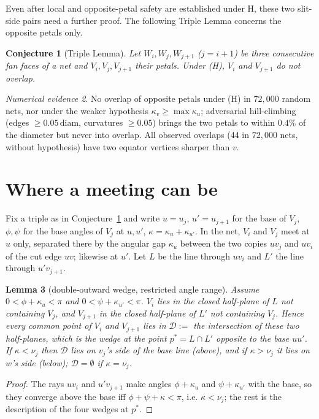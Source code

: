 \documentclass[11pt]{article}
\newtheorem{lemma}{Lemma}
\newtheorem{conjecture}[lemma]{Conjecture}
\theoremstyle{definition}
\theoremstyle{remark}
\newtheorem{numerics}[lemma]{Numerical evidence}
\newcommand{\D}{\mathcal{D}}
\begin{document}
Even after local and opposite-petal safety are established under H, these
two slit-side pairs need a further proof. The following Triple Lemma concerns
the opposite petals only.

\begin{conjecture}[Triple Lemma]\label{triple}
Let $W_i,W_j,W_{j+1}$ ($j=i+1$) be three consecutive fan faces of a net and $V_i,V_j,V_{j+1}$ their petals.
Under (H), $V_i$ and $V_{j+1}$ do not overlap.
\end{conjecture}

\begin{numerics}
No overlap of opposite petals under (H) in $72{,}000$ random nets, nor under the weaker hypothesis
$\kappa_v\ge\max\kappa_{u}$; adversarial hill-climbing (edges $\ge 0.05\,\mathrm{diam}$, curvatures $\ge 0.05$)
brings the two petals to within $0.4\%$ of the diameter but never into overlap. All observed overlaps
(44 in $72{,}000$ nets, without hypothesis) have two equator vertices sharper than $v$.
\end{numerics}

\section{Where a meeting can be}\label{sec:D}

Fix a triple as in Conjecture~\ref{triple} and write $u=u_j$, $u'=u_{j+1}$ for the base of $V_j$,
$\phi,\psi$ for the base angles of $V_j$ at $u,u'$, $\kappa=\kappa_u+\kappa_{u'}$.
In the net, $V_i$ and $V_j$ meet at $u$ only, separated there by the angular gap $\kappa_u$ between the two
copies $uv_j$ and $uv_i$ of the cut edge $uv$; likewise at $u'$.
Let $L$ be the line through $uv_i$ and $L'$ the line through $u'v_{j+1}$.

\begin{lemma}[double-outward wedge, restricted angle range]\label{D}
Assume $0<\phi+\kappa_u<\pi$ and $0<\psi+\kappa_{u'}<\pi$.
$V_i$ lies in the closed half-plane of $L$ not containing $V_j$, and $V_{j+1}$ in the closed half-plane of
$L'$ not containing $V_j$. Hence every common point of $V_i$ and $V_{j+1}$ lies in
$\D:=$ the intersection of these two half-planes, which is the wedge at the point $p^*=L\cap L'$ opposite
to the base $uu'$. If $\kappa<\nu_j$ then $\D$ lies on $v_j$'s side of the base line (above), and if
$\kappa>\nu_j$ it lies on $w$'s side (below); $\D=\emptyset$ if $\kappa=\nu_j$.
\end{lemma}
\begin{proof}
The rays $uv_i$ and $u'v_{j+1}$ make angles $\phi+\kappa_u$ and $\psi+\kappa_{u'}$ with the base, so they
converge above the base iff $\phi+\psi+\kappa<\pi$, i.e. $\kappa<\nu_j$; the rest is the description of the
four wedges at $p^*$.
\end{proof}
\end{document}
